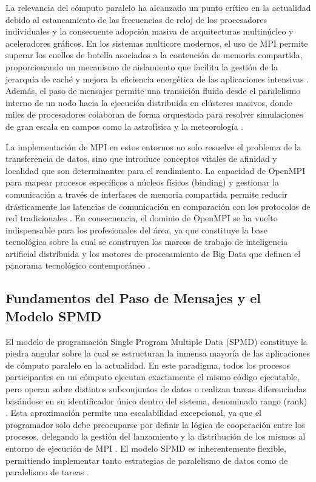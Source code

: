 La relevancia del cómputo paralelo ha alcanzado un punto crítico en la actualidad debido al estancamiento de las frecuencias de reloj de los procesadores individuales y la consecuente adopción masiva de arquitecturas multinúcleo y aceleradores gráficos. En los sistemas multicore modernos, el uso de MPI permite superar los cuellos de botella asociados a la contención de memoria compartida, proporcionando un mecanismo de aislamiento que facilita la gestión de la jerarquía de caché y mejora la eficiencia energética de las aplicaciones intensivas \cite{ref8_cristian_Nielsen2016, ref11_cristian_OpenMPI_FAQ}. Además, el paso de mensajes permite una transición fluida desde el paralelismo interno de un nodo hacia la ejecución distribuida en clústeres masivos, donde miles de procesadores colaboran de forma orquestada para resolver simulaciones de gran escala en campos como la astrofísica y la meteorología \cite{ref9_cristian_Gropp1996, ref1_cristian_MPIStandard41}.

La implementación de MPI en estos entornos no solo resuelve el problema de la transferencia de datos, sino que introduce conceptos vitales de afinidad y localidad que son determinantes para el rendimiento. La capacidad de OpenMPI para mapear procesos específicos a núcleos físicos (binding) y gestionar la comunicación a través de interfaces de memoria compartida permite reducir drásticamente las latencias de comunicación en comparación con los protocolos de red tradicionales \cite{ref5_cristian_Graham2006, ref11_cristian_OpenMPI_FAQ}. En consecuencia, el dominio de OpenMPI se ha vuelto indispensable para los profesionales del área, ya que constituye la base tecnológica sobre la cual se construyen los marcos de trabajo de inteligencia artificial distribuida y los motores de procesamiento de Big Data que definen el panorama tecnológico contemporáneo \cite{ref15_cristian_CARC_MPI_Guide}.

\subsection{Fundamentos del Paso de Mensajes y el Modelo SPMD}

El modelo de programación Single Program Multiple Data (SPMD) constituye la piedra angular sobre la cual se estructuran la inmensa mayoría de las aplicaciones de cómputo paralelo en la actualidad. En este paradigma, todos los procesos participantes en un cómputo ejecutan exactamente el mismo código ejecutable, pero operan sobre distintos subconjuntos de datos o realizan tareas diferenciadas basándose en su identificador único dentro del sistema, denominado rango (rank) \cite{ref9_cristian_Gropp1996, ref8_cristian_Nielsen2016}. Esta aproximación permite una escalabilidad excepcional, ya que el programador solo debe preocuparse por definir la lógica de cooperación entre los procesos, delegando la gestión del lanzamiento y la distribución de los mismos al entorno de ejecución de MPI \cite{ref9_cristian_Gropp1996}. El modelo SPMD es inherentemente flexible, permitiendo implementar tanto estrategias de paralelismo de datos como de paralelismo de tareas \cite{ref9_cristian_Gropp1996, ref8_cristian_Nielsen2016}.

